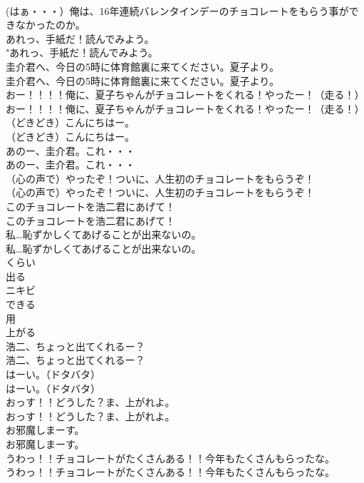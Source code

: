 \documentclass[8pt]{extreport}
\begin{document}
\begin{CJK}{UTF8}{min}
\\	(はぁ・・・）俺は、16年連続バレンタインデーのチョコレートをもらう事ができなかったのか。 
\\	あれっ、手紙だ！読んでみよう。	
\\	"あれっ、手紙だ！読んでみよう。 
\\	圭介君へ、今日の5時に体育館裏に来てください。夏子より。	
\\	圭介君へ、今日の5時に体育館裏に来てください。夏子より。 
\\	おー！！！！俺に、夏子ちゃんがチョコレートをくれる！やったー！（走る！）	
\\	おー！！！！俺に、夏子ちゃんがチョコレートをくれる！やったー！（走る！） 
\\	（どきどき）こんにちはー。	
\\	（どきどき）こんにちはー。 
\\	あのー、圭介君。これ・・・	
\\	あのー、圭介君。これ・・・ 
\\	（心の声で）やったぞ！ついに、人生初のチョコレートをもらうぞ！	
\\	（心の声で）やったぞ！ついに、人生初のチョコレートをもらうぞ！ 
\\	このチョコレートを浩二君にあげて！	
\\	このチョコレートを浩二君にあげて！ 
\\	私…恥ずかしくてあげることが出来ないの。	
\\	私…恥ずかしくてあげることが出来ないの。 
\\	くらい
\\	出る
\\	ニキビ
\\	できる
\\	用
\\	上がる
\\	浩二、ちょっと出てくれるー？	
\\	浩二、ちょっと出てくれるー？ 
\\	はーい。（ドタバタ）	
\\	はーい。（ドタバタ） 
\\	おっす！！どうした？ま、上がれよ。	
\\	おっす！！どうした？ま、上がれよ。 
\\	お邪魔しまーす。	
\\	お邪魔しまーす。 
\\	うわっ！！チョコレートがたくさんある！！今年もたくさんもらったな。	
\\	うわっ！！チョコレートがたくさんある！！今年もたくさんもらったな。 

\end{CJK}
\end{document}
